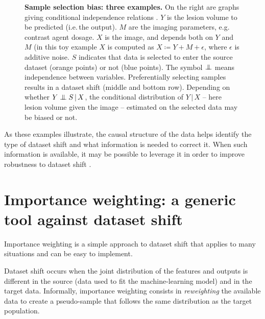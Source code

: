 \documentclass[twocolumn]{article}
\newcommand{\giv}{ \,|\, }
\newcommand\indep{\protect\mathpalette{\protect\independenT}{\perp}}
\def\independenT#1#2{\mathrel{\rlap{$#1#2$}\mkern3.5mu{#1#2}}}
\newcommand{\eg}{e.g.\,}
\newcommand{\ie}{i.e.\,}
\begin{document}
\begin{figure}
\begin{minipage}{.3\textwidth}
\begin{minipage}{\textwidth}
  \end{minipage}
  \end{minipage}
  \caption{\textbf{Sample selection bias: three examples.}
    On the right are graphs giving conditional independence relations
    \citep{pearl2016causal}.
    \(Y\) is the lesion volume to be predicted (\ie the output).  \(M\) are the imaging
    parameters, \eg contrast agent dosage. \(X\) is the image, and depends both
    on \(Y\) and \(M\) (in this toy example \(X\) is computed as
    \(X \coloneqq Y + M + \epsilon\), where \(\epsilon\) is additive noise.
    \(S\) indicates that data is selected to enter the source dataset (orange
    points) or not (blue points).  The symbol \(\indep\) means independence
    between variables.
    Preferentially selecting samples results in a dataset shift (middle and
    bottom row). Depending on whether \(Y \indep S  \giv X\), the conditional
    distribution of \(Y \giv X\) -- here lesion volume given the image -- estimated on
    the selected data may be biased or not.
}
  \label{fig:sample-selection-bias}

\end{figure}
%
As these examples illustrate, the causal structure of the data helps identify
the type of dataset shift and what information is needed to correct it.
%
When such information is available, it may be possible to leverage it in order to improve robustness to dataset shift \citep[\eg][]{subbaswamy2019preventing}.


\section{Importance weighting: a generic tool against dataset shift}\label{sec:importance-weighting}
Importance weighting is a simple approach to dataset shift that applies to
many situations and can be easy to implement.
%

%
Dataset shift occurs when the joint distribution of the features and outputs is
different in the source (data used to fit the machine-learning model) and in the target data.
%
Informally, importance weighting consists in \emph{reweighting} the
available data to create a pseudo-sample that follows the same distribution as
the target population.
%
\end{document}
